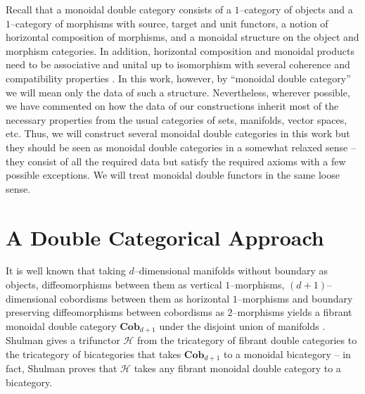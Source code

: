 \documentclass{amsart}
\newcommand{\Cob}{\textbf{Cob}}
\numberwithin{thm}{section}
\theoremstyle{definition}
\begin{document}
Recall that a monoidal double category consists of a $1$--category of objects
and a $1$--category of morphisms with source, target and unit functors, a notion
of horizontal composition of morphisms, and a monoidal structure on the object
and morphism categories. In addition, horizontal composition and monoidal
products need to be associative and unital up to isomorphism with several
coherence and compatibility properties \cite{SymMonBicat}. In this work,
however, by ``monoidal double category'' we will mean only the data of such a
structure. Nevertheless, wherever possible, we have commented on how the data of
our constructions inherit most of the necessary properties from the usual
categories of sets, manifolds, vector spaces, etc. Thus, we will construct
several monoidal double categories in this work but they should be seen as
monoidal double categories in a somewhat relaxed sense -- they consist of all
the required data but satisfy the required axioms with a few possible
exceptions. We will treat monoidal double functors in the same loose sense.

%

\section{A Double Categorical Approach}

It is well known that taking $d$--dimensional manifolds without boundary as
objects, diffeomorphisms between them as vertical $1$--morphisms, $(d +
1)$--dimensional cobordisms between them as horizontal $1$--morphisms and
boundary preserving diffeomorphisms between cobordisms as $2$--morphisms yields
a fibrant monoidal double category $\Cob_{d + 1}$ under the disjoint union of
manifolds \cite{SymMonBicat}. Shulman gives a trifunctor $\mathcal{H}$ from the
tricategory of fibrant double categories to the tricategory of bicategories that
takes $\Cob_{d + 1}$ to a monoidal bicategory -- in fact, Shulman proves that
$\mathcal{H}$ takes any fibrant monoidal double category to a bicategory.
\end{document}
